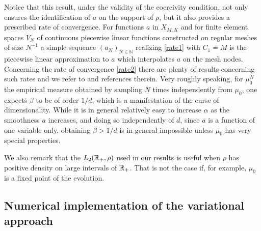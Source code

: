 Notice that this result, under the validity of the coercivity condition, not only ensures the identification of $a$ on the support of $\rho$, but it also provides a prescribed rate of convergence.
For functions $a$ in $X_{M,K}$ and for finite element spaces $V_N$ of continuous piecewise linear functions constructed on regular meshes of size $N^{-1}$ a simple sequence $(a_N)_{N \in \mathbb N}$  realizing \eqref{rate1} with $C_1=M$ is the piecewise linear approximation to $a$ which interpolates $a$ on the mesh nodes. Concerning the rate of convergence \eqref{rate2} there are plenty of results
concerning such rates and we refer to \cite{descsc13} and references therein. Very roughly speaking, for $\mu_0^N$ the empirical measure obtained by sampling $N$ times independently from $\mu_0$, one expects $\beta$ to be of order $1/d$, which is a manifestation of the curse of dimensionality. While it is in general relatively easy to increase $\alpha$ as the smoothness $a$ increases, and doing so independently of $d$, since $a$ is a function of one variable only, obtaining $\beta>1/d$ is in general impossible unless $\mu_0$ has very special properties.

We also remark that the $L_2(\mathbb{R}_+,\rho)$ used in our results is useful when $\rho$ has positive density on large intervals of $\mathbb{R}_+$. That is not the case if, for example, $\mu_0$ is a fixed point of the evolution.


\subsection{Numerical implementation of the variational approach }\label{sec:wp3}


